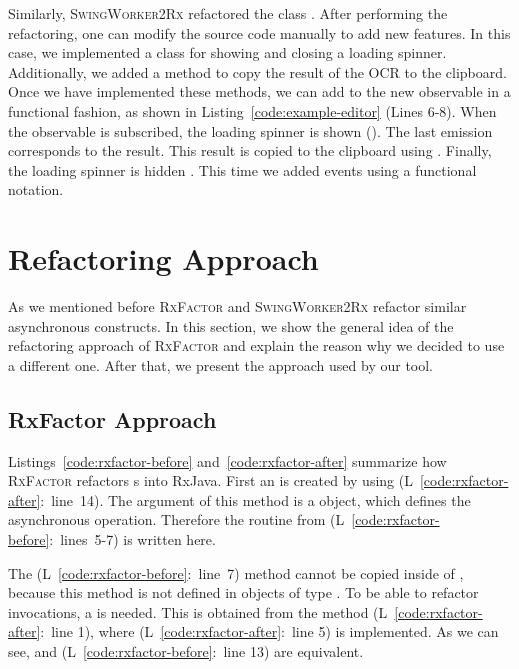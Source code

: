 \documentclass[type=bsc,accentcolor=tud9c]{tudthesis}
\newcommand{\framework}[1]{\textcolor{black!65}{#1}}
\newcommand{\toolextension}{\textsc{SwingWorker2Rx}}
\begin{document}
Similarly, \toolextension{} refactored the class . After performing the refactoring, one can modify the source code manually to add new features. In this case, we implemented a  class for showing and closing a loading spinner. Additionally, we added a method to copy the result of the OCR to the clipboard. Once we have implemented these methods, we can add to the new observable in a functional fashion, as shown in Listing~\ref{code:example-editor} (Lines 6-8). When the observable is subscribed, the loading spinner is shown (). The last emission corresponds to the result. This result is copied to the clipboard using . Finally, the loading spinner is hidden . This time we added events using a functional notation.



\section{Refactoring Approach}
As we mentioned before \textsc{RxFactor} and \toolextension{} refactor similar asynchronous constructs. In this section, we show the general idea of the refactoring approach of \textsc{RxFactor} and explain the reason why we decided to use a different one. After that, we present the approach used by our tool.

\subsection{RxFactor Approach}
Listings~\ref{code:rxfactor-before} and~\ref{code:rxfactor-after} summarize how \textsc{RxFactor} refactors s into \framework{RxJava}. First an  is created by using  (L~\ref{code:rxfactor-after}:~line~14). The argument of this method is a  object, which defines the asynchronous operation. Therefore the routine from  (L~\ref{code:rxfactor-before}:~lines~5-7) is written here. 

The  (L~\ref{code:rxfactor-before}:~line~7) method cannot be copied inside of , because this method is not defined in objects of type . To be able to refactor  invocations, a  is needed. This  is obtained from the method  (L~\ref{code:rxfactor-after}:~line 1), where  (L~\ref{code:rxfactor-after}:~line 5) is implemented. As we can see,  and  (L~\ref{code:rxfactor-before}:~line 13) are equivalent. 
\end{document}
